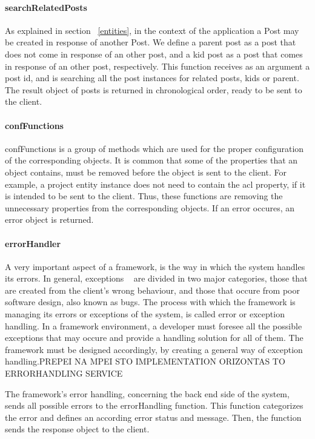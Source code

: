 \paragraph{searchRelatedPosts}
As explained in section ~\ref{entities}, in the context of the application a Post may be created in response of another Post. We define a parent post as a post that does not come in response of an other post, and a kid post as a post that comes in response of an other post, respectively. This function receives as an argument a post id, and is searching all the post instances for related posts, kids or parent. The result object of posts is returned in chronological order, ready to be sent to the client.

\paragraph{confFunctions}
confFunctions is a group of methods which are used for the proper configuration of the corresponding objects. It is common that some of the properties that an object contains, must be removed before the object is sent to the client. For example, a project entity instance does not need to contain the acl property, if it is intended to be sent to the client. Thus, these functions are removing the unnecessary properties from the corresponding objects. If an error occures, an error object is returned.

\paragraph{errorHandler}
A very important aspect of a framework, is the way in which the system handles its errors. In general, exceptions ~\cite{carlson2000method} are divided in two major categories, those that are created from the client's wrong behaviour, and those that occure from poor software design, also known as bugs. The process with which the framework is managing its errors or exceptions of the system, is called error or exception handling. In a framework environment, a developer must foresee all the possible exceptions that may occure and provide a handling solution for all of them. The framework must be designed accordingly, by creating a general way of exception handling.PREPEI NA MPEI STO IMPLEMENTATION ORIZONTAS TO ERRORHANDLING SERVICE \par
	The framework's error handling, concerning the back end side of the system, sends all possible errors to the errorHandling function. This function categorizes the error and defines an according error status and message. Then, the function sends the response object to the client.
	
